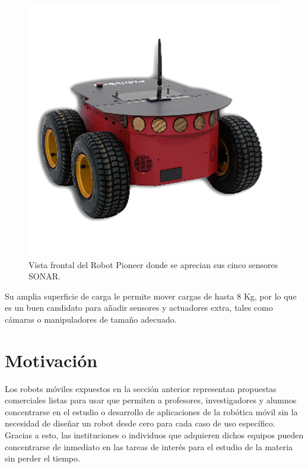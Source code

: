\begin{figure}[ht]
	\centering
	\includegraphics[scale=1.]{./Figures/pioneer.png}
	\caption{Vista frontal del Robot Pioneer donde se aprecian sus cinco sensores SONAR.\protect\footnotemark}
	\label{fig:robotPioneer}
\end{figure}


Su amplia superficie de carga le permite mover cargas de hasta 8 Kg, por lo que es un buen candidato para añadir sensores y actuadores extra, tales como cámaras o manipuladores de tamaño adecuado.

\section{Motivación}

Los robots móviles expuestos en la sección anterior representan propuestas comerciales listas para usar que permiten a profesores, investigadores y alumnos concentrarse en el estudio o desarrollo de aplicaciones de la robótica móvil sin la necesidad de diseñar un robot desde cero para cada caso de uso específico. Gracias a esto, las instituciones o individuos que adquieren dichos equipos pueden concentrarse de inmediato en las tareas de interés para el estudio de la materia sin perder el tiempo.

